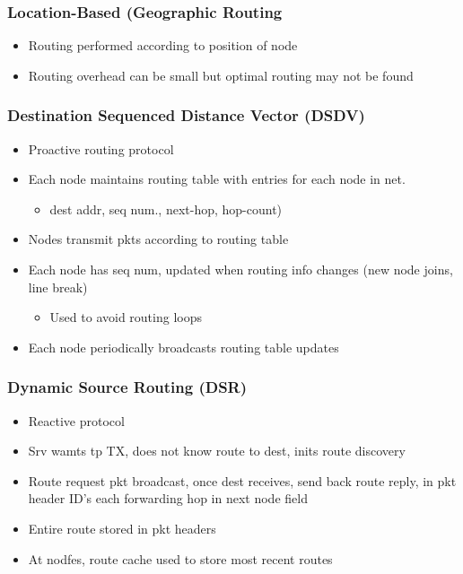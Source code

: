 \subsubsection{Location-Based (Geographic Routing}
\begin{itemize}
	\item Routing performed according to position of node
	\item Routing overhead can be small but optimal routing may not be found
\end{itemize}
\subsubsection{Destination Sequenced Distance Vector (DSDV)}
\begin{itemize}
	\item Proactive routing protocol
	\item Each node maintains routing table with entries for each node in
		net.
	\begin{itemize}
		\item dest addr, seq num., next-hop, hop-count)
	\end{itemize}
	\item Nodes transmit pkts according to routing table
	\item Each node has seq num, updated when routing info changes (new node
		joins, line break)
	\begin{itemize}
		\item Used to avoid routing loops
	\end{itemize}
	\item Each node periodically broadcasts routing table updates
\end{itemize}
\subsubsection{Dynamic Source Routing (DSR)}
\begin{itemize}
	\item Reactive protocol
	\item Srv wamts tp TX, does not know route to dest, inits route
		discovery
	\item Route request pkt broadcast, once dest receives, send back route
		reply, in pkt header ID's each forwarding hop in next node field
	\item Entire route stored in pkt headers
	\item At nodfes, route cache used to store most recent routes
\end{itemize}
